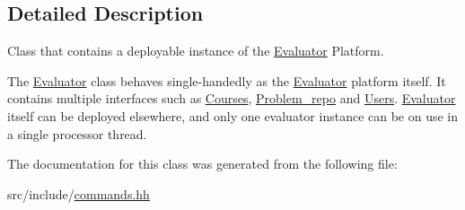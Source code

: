 \subsection{Detailed Description}
Class that contains a deployable instance of the \hyperlink{classEvaluator}{Evaluator} Platform. 

The \hyperlink{classEvaluator}{Evaluator} class behaves single-\/handedly as the \hyperlink{classEvaluator}{Evaluator} platform itself. It contains multiple interfaces such as \hyperlink{classCourses}{Courses}, \hyperlink{classProblem__repo}{Problem\+\_\+repo} and \hyperlink{classUsers}{Users}. \hyperlink{classEvaluator}{Evaluator} itself can be deployed elsewhere, and only one evaluator instance can be on use in a single processor thread. 

The documentation for this class was generated from the following file\+:\begin{DoxyCompactItemize}
\item 
src/include/\hyperlink{commands_8hh}{commands.\+hh}\end{DoxyCompactItemize}
